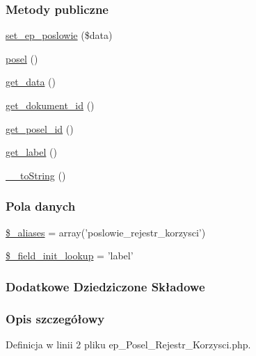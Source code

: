 \subsubsection*{Metody publiczne}
\begin{DoxyCompactItemize}
\item 
\hyperlink{classep___posel___rejestr___korzysci_a6a354494d54778bcc9254b5826b5f28c}{set\-\_\-ep\-\_\-poslowie} (\$data)
\item 
\hyperlink{classep___posel___rejestr___korzysci_ad3b9fc55831f7bcabb4870306bc08f4b}{posel} ()
\item 
\hyperlink{classep___posel___rejestr___korzysci_ab5976d1ba325a739761c2eb6662f58a9}{get\-\_\-data} ()
\item 
\hyperlink{classep___posel___rejestr___korzysci_adc3366b534d8e1e2570fd6a80624d7ed}{get\-\_\-dokument\-\_\-id} ()
\item 
\hyperlink{classep___posel___rejestr___korzysci_ae47740401fd789790ece81a1b64abfb2}{get\-\_\-posel\-\_\-id} ()
\item 
\hyperlink{classep___posel___rejestr___korzysci_abdc537eb3d5a2920cd5d5ea317750660}{get\-\_\-label} ()
\item 
\hyperlink{classep___posel___rejestr___korzysci_a7516ca30af0db3cdbf9a7739b48ce91d}{\-\_\-\-\_\-to\-String} ()
\end{DoxyCompactItemize}
\subsubsection*{Pola danych}
\begin{DoxyCompactItemize}
\item 
\hyperlink{classep___posel___rejestr___korzysci_ab4e31d75f0bc5d512456911e5d01366b}{\$\-\_\-aliases} = array('poslowie\-\_\-rejestr\-\_\-korzysci')
\item 
\hyperlink{classep___posel___rejestr___korzysci_a4a4d54ae35428077a7c61ec8a5139af3}{\$\-\_\-field\-\_\-init\-\_\-lookup} = 'label'
\end{DoxyCompactItemize}
\subsubsection*{Dodatkowe Dziedziczone Składowe}


\subsubsection{Opis szczegółowy}


Definicja w linii 2 pliku ep\-\_\-\-Posel\-\_\-\-Rejestr\-\_\-\-Korzysci.\-php.



